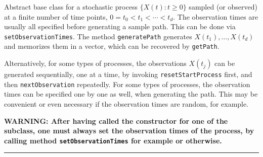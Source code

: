 
Abstract base class for a stochastic process $\{X(t) : t \geq 0 \}$
sampled (or observed) at a finite number of time points,
$0 = t_0 < t_1 < \cdots < t_d$.
The observation times are usually all specified before generating a sample path.
This can be done via \texttt{setObservationTimes}.
The method \texttt{generatePath} generates $X(t_1),\dots,X(t_d)$ and memorizes
them in a vector, which can be recovered by \texttt{getPath}.

Alternatively, for some types of processes, the observations $X(t_j)$ can be
generated sequentially, one at a time, by invoking  \texttt{resetStartProcess}
first, and then \texttt{nextObservation} repeatedly.
For some types of processes, the observation times can be specified one by one
as well, when generating the path.  This may be convenient or even necessary
if the observation times are random, for example.

\textbf{WARNING: After having called the constructor for one of the subclass,
 one must always set the observation times of the process,
 by calling method \texttt{setObservationTimes} for example or otherwise.}



\bigskip\hrule\bigskip

